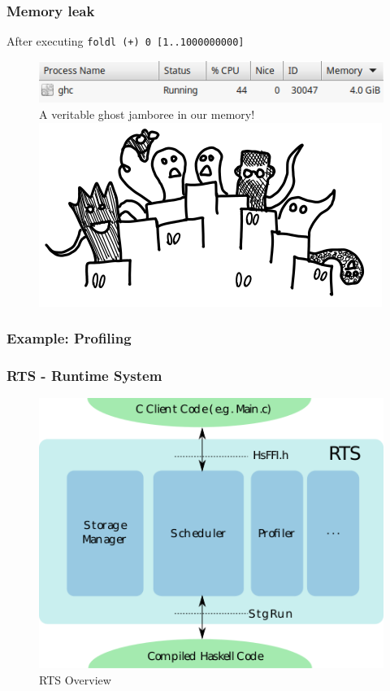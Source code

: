 \documentclass{beamer}
\newcommand{\inlinehaskell}[1]{\texttt{#1}}
\begin{document}

\begin{frame}
\frametitle{Memory leak}
After executing \inlinehaskell{foldl (+) 0 [1..1000000000]}\newline
\begin{figure}[hbt!]
    \centering
    \includegraphics[height=0.1\textheight]{./pic/memory-usage-ghc.png}
    \newline\newline
    A veritable ghost jamboree in our memory!
    \includegraphics[height=0.4\textheight]{./pic/ghost-party.png}
\end{figure}
\end{frame}


\begin{frame}
\frametitle{Example: Profiling}
\bigskip
\end{frame}


\begin{frame}
\frametitle{RTS - Runtime System}
\begin{figure}[hbt!]
\begin{center}
\includegraphics[height=0.6\textheight]{./pic/rts-overview.png}
\caption{RTS Overview}
\end{center}
\end{figure}

\end{frame}
\end{document}
